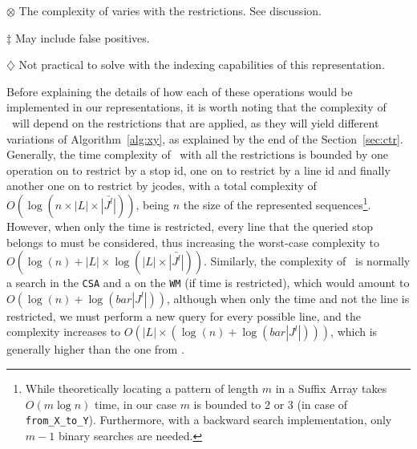 \begin{threeparttable}
    \begin{tablenotes}
    \item[$\otimes$] The complexity of varies with the restrictions. See discussion.
    \item[$\ddagger$] May include false positives.
    \item[$\diamondsuit$] Not practical to solve with the indexing capabilities of this representation.
    \end{tablenotes}
    \end{threeparttable}
    
    \medskip
    Before explaining the details of how each of these operations would be implemented in our representations, it is worth noting that the complexity of \ctrq~will depend on the restrictions that are applied, as they will yield different variations of Algorithm~\ref{alg:xy}, as explained by the end of the Section~\ref{sec:ctr}. Generally, the time complexity of \ctrq~with all the restrictions is bounded by one  operation on  to restrict by a stop id, one on  to restrict by a line id and finally another one on  to restrict by jcodes, with a total complexity of $O(\log(n\times|L|\times\bar{|J^l|}))$, being $n$ the size of the represented sequences\footnote{While theoretically locating a pattern of length $m$ in a Suffix Array takes $O(m \log n)$ time, in our case $m$ is bounded to 2 or 3 (in case of \texttt{from\_X\_to\_Y}). Furthermore, with a backward search implementation, only $m-1$ binary searches are needed.}.
    However, when only the time is restricted, every line that the queried stop belongs to must be considered, thus increasing the worst-case complexity to $O(\log(n) + |L|\times \log(|L|\times\bar{|J^l|}))$. Similarly, the complexity of \ttctrq~is normally a search in the \texttt{CSA} and a  on the \texttt{WM} (if time is restricted), which would amount to $O(\log(n) + \log(bar{|J^l|}))$, although when only the time and not the line is restricted, we must perform a new query for every possible line, and the complexity increases to $O(|L|\times (\log(n) + \log(bar{|J^l|})))$, which is generally higher than the one from \ctrq.
    
